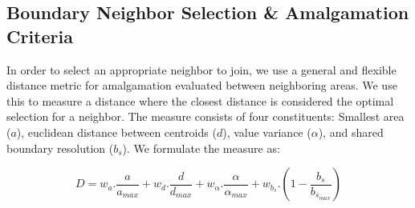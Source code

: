 \subsection{Boundary Neighbor Selection \& Amalgamation Criteria} \label{boundaryTree}
In order to select an appropriate neighbor to join, we use a  general and flexible distance metric for amalgamation evaluated between neighboring areas. We use this to measure a distance where the closest distance is considered the optimal selection for a neighbor. The measure consists of four constituents: Smallest area ($a$), euclidean distance between centroids ($d$), value variance ($\alpha$), and shared boundary resolution ($b_s$). We formulate the measure as:

\begin{equation}
D = w_a.\frac{a}{a_{max}} + w_d.\frac{d}{d_{max}} + w_\alpha.\frac{\alpha}{\alpha_{max}} + w_{b_s}.(1-\frac{b_s}{b_{s_{max}}})
\end{equation}


